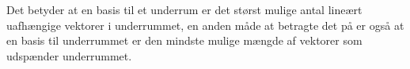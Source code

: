 Det betyder at en basis til et underrum er det størst mulige antal lineært uafhængige vektorer i underrummet, en anden måde at betragte det på er også at en basis til underrummet er den mindste mulige mængde af vektorer som udspænder underrummet.

